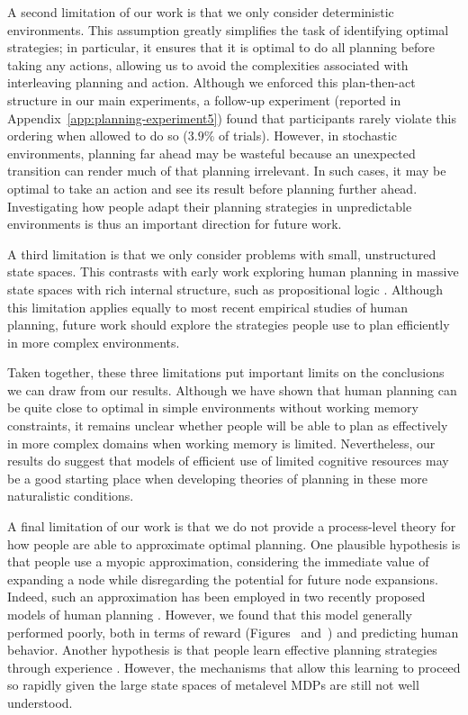 A second limitation of our work is that we only consider deterministic environments. This assumption greatly simplifies the task of identifying optimal strategies; in particular, it ensures that it is optimal to do all planning before taking any actions, allowing us to avoid the complexities associated with interleaving planning and action. Although we enforced this plan-then-act structure in our main experiments, a follow-up experiment (reported in Appendix~\ref{app:planning-experiment5}) found that participants rarely violate this ordering when allowed to do so ($3.9\%$ of trials). However, in stochastic environments, planning far ahead may be wasteful because an unexpected transition can render much of that planning irrelevant. In such cases, it may be optimal to take an action and see its result before planning further ahead. Investigating how people adapt their planning strategies in unpredictable environments is thus an important direction for future work.

A third limitation is that we only consider problems with small, unstructured state spaces. This contrasts with early work exploring human planning in massive state spaces with rich internal structure, such as propositional logic \citep{newell1972human}. Although this limitation applies equally to most recent empirical studies of human planning, future work should explore the strategies people use to plan efficiently in more complex environments.

Taken together, these three limitations put important limits on the conclusions we can draw from our results. Although we have shown that human planning can be quite close to optimal in simple environments without working memory constraints, it remains unclear whether people will be able to plan as effectively in more complex domains when working memory is limited. Nevertheless, our results do suggest that models of efficient use of limited cognitive resources may be a good starting place when developing theories of planning in these more naturalistic conditions.

A final limitation of our work is that we do not provide a process-level theory for how people are able to approximate optimal planning. One plausible hypothesis is that people use a myopic approximation, considering the immediate value of expanding a node while disregarding the potential for future node expansions. Indeed, such an approximation has been employed in two recently proposed models of human planning \citep{mattar2018prioritized,sezener2019optimizing}. However, we found that this model generally performed poorly, both in terms of reward (Figures~ and~) and predicting human behavior. Another hypothesis is that people learn effective planning strategies through experience \citep{lieder2017strategy,krueger2017enhancing}. However, the mechanisms that allow this learning to proceed so rapidly given the large state spaces of metalevel MDPs are still not well understood.

